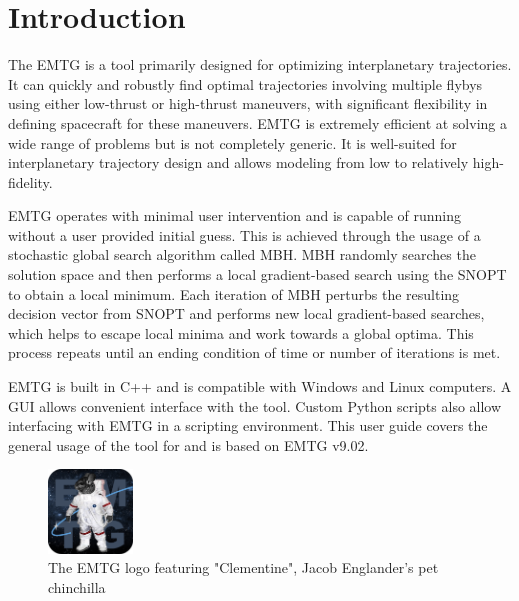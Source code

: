 \chapter{Introduction}
\label{chap:intro}
The \acf{EMTG} is a tool primarily designed for optimizing interplanetary trajectories. It can quickly and robustly find optimal trajectories involving multiple flybys using either low-thrust or high-thrust maneuvers, with significant flexibility in defining spacecraft for these maneuvers. \ac{EMTG} is extremely efficient at solving a wide range of problems but is not completely generic. It is well-suited for interplanetary trajectory design and allows modeling from low to relatively high-fidelity.

\noindent \ac{EMTG} operates with minimal user intervention and is capable of running without a user provided initial guess. This is achieved through the usage of a stochastic global search algorithm called \ac{MBH}. \ac{MBH} randomly searches the solution space and then performs a local gradient-based search using the \ac{SNOPT} to obtain a local minimum. Each iteration of \ac{MBH} perturbs the resulting decision vector from \ac{SNOPT} and performs new local gradient-based searches, which helps to escape local minima and work towards a global optima. This process repeats until an ending condition of time or number of iterations is met. 

\noindent \ac{EMTG} is built in C++ and is compatible with Windows and Linux computers. A \ac{GUI} allows convenient interface with the tool. Custom Python scripts also allow interfacing with \ac{EMTG} in a scripting environment. This user guide covers the general usage of the tool for and is based on \ac{EMTG} v9.02.

\begin{figure}[H]
    \centering
    \includegraphics[width=0.2\textwidth]{../../shared_latex_inputs/images/EMTG_logo_clemonaut.png}
    \caption{The EMTG logo featuring "Clementine", Jacob Englander's pet chinchilla}
\end{figure}
